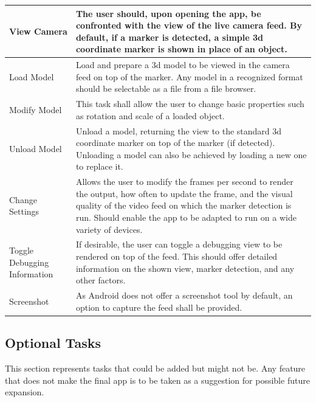 \begin{tabulary}{\textwidth}{L || L}
View Camera & The user should, upon opening the app, be confronted with the view of the live camera feed. By default, if a marker is detected, a simple 3d coordinate marker is shown in place of an object. \\
\hline
Load Model & Load and prepare a 3d model to be viewed in the camera feed on top of the marker. Any model in a recognized format should be selectable as a file from a file browser. \\
\hline
Modify Model & This task shall allow the user to change basic properties such as rotation and scale of a loaded object.\\
\hline
Unload Model & Unload a model, returning the view to the standard 3d coordinate marker on top of the marker (if detected). Unloading a model can also be achieved by loading a new one to replace it. \\
\hline
Change Settings & Allows the user to modify the frames per second to render the output, how often to update the frame, and the visual quality of the video feed on which the marker detection is run. Should enable the app to be adapted to run on a wide variety of devices.\\
\hline
Toggle Debugging Information & If desirable, the user can toggle a debugging view to be rendered on top of the feed. This should offer detailed information on the shown view, marker detection, and any other factors. \\
\hline
Screenshot & As Android does not offer a screenshot tool by default, an option to capture the feed shall be provided. \\
\end{tabulary}

\subsection{Optional Tasks}

This section represents tasks that could be added but might not be.
Any feature that does not make the final app is to be taken as a suggestion for possible future expansion.

